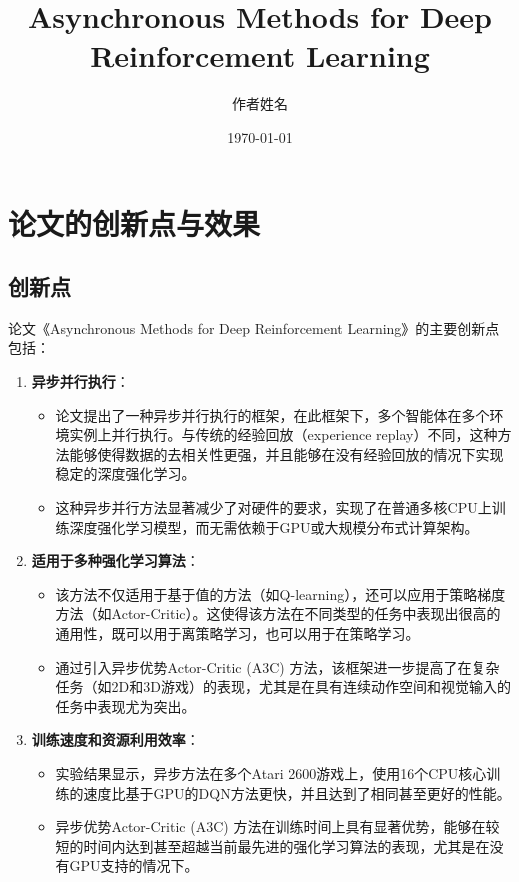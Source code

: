 \documentclass[twocolumn, 10pt]{article} %
\theoremstyle{remark}
\begin{document}
\title{Asynchronous Methods for Deep Reinforcement Learning}
\author{作者姓名}
\date{\today}
\maketitle

\section{论文的创新点与效果}

\subsection{创新点}

论文《Asynchronous Methods for Deep Reinforcement Learning》的主要创新点包括：

\begin{enumerate}
    \item \textbf{异步并行执行}：
    \begin{itemize}
        \item 论文提出了一种异步并行执行的框架，在此框架下，多个智能体在多个环境实例上并行执行。与传统的经验回放（experience replay）不同，这种方法能够使得数据的去相关性更强，并且能够在没有经验回放的情况下实现稳定的深度强化学习。
        \item 这种异步并行方法显著减少了对硬件的要求，实现了在普通多核CPU上训练深度强化学习模型，而无需依赖于GPU或大规模分布式计算架构。
    \end{itemize}
    
    \item \textbf{适用于多种强化学习算法}：
    \begin{itemize}
        \item 该方法不仅适用于基于值的方法（如Q-learning），还可以应用于策略梯度方法（如Actor-Critic）。这使得该方法在不同类型的任务中表现出很高的通用性，既可以用于离策略学习，也可以用于在策略学习。
        \item 通过引入异步优势Actor-Critic (A3C) 方法，该框架进一步提高了在复杂任务（如2D和3D游戏）的表现，尤其是在具有连续动作空间和视觉输入的任务中表现尤为突出。
    \end{itemize}
    
    \item \textbf{训练速度和资源利用效率}：
    \begin{itemize}
        \item 实验结果显示，异步方法在多个Atari 2600游戏上，使用16个CPU核心训练的速度比基于GPU的DQN方法更快，并且达到了相同甚至更好的性能。
        \item 异步优势Actor-Critic (A3C) 方法在训练时间上具有显著优势，能够在较短的时间内达到甚至超越当前最先进的强化学习算法的表现，尤其是在没有GPU支持的情况下。
    \end{itemize}
\end{enumerate}
\end{document}
